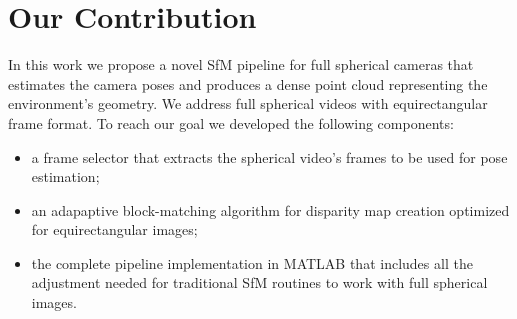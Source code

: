 \section{Our Contribution}
In this work we propose a novel SfM pipeline for full spherical cameras that 
estimates the camera poses and produces a dense point cloud representing the 
environment's geometry. We address full spherical videos with 
equirectangular frame format. To reach our goal we developed the following 
components:
\begin{itemize}
	\item a frame selector that extracts the spherical video's frames to 
		be used for pose estimation;
	\item an adapaptive block-matching algorithm for disparity map 
		creation optimized for equirectangular images;
	\item the complete pipeline implementation in MATLAB that includes 
		all the adjustment needed for traditional SfM routines to 
		work with full spherical images.
\end{itemize}
